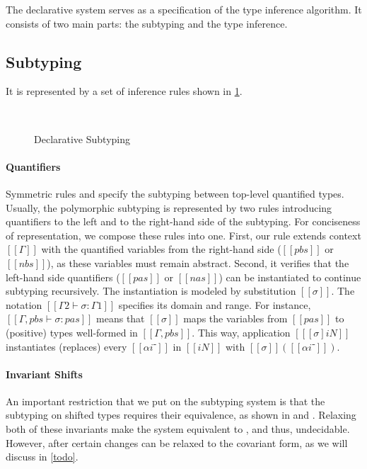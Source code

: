 
The declarative system serves as a specification of the
type inference algorithm. It consists of two main parts:
the subtyping and the type inference. 

\subsection{Subtyping}
It is represented by a set of inference rules shown in
\cref{fig:declarative-subtyping}.

\begin{figure}[h]
  \begin{multicols}{2}
    \ottdefnDOneNsub{}

    \ottdefnDOnePsup{}
  \end{multicols}
  \hfill\\
  \begin{multicols}{2}
    \ottdefnDOneNeq{}

    \ottdefnDOnePeq{}
  \end{multicols}
  \caption{Declarative Subtyping}
  \label{fig:declarative-subtyping}
\end{figure}

\paragraph{Quantifiers}  
Symmetric rules  and 
 specify 
the subtyping between top-level quantified types.
Usually, the polymorphic subtyping is represented by two rules
introducing quantifiers to the left and to the right-hand side of the subtyping.
For conciseness of representation, we compose these rules into one.
First, our rule extends context $[[Γ]]$ with the quantified variables 
from the right-hand side ($[[pbs]]$ or $[[nbs]]$), 
as these variables must remain abstract.
Second, it verifies that the left-hand side quantifiers
($[[pas]]$ or $[[nas]]$) can be instantiated to continue subtyping recursively. 
The instantiation is modeled by substitution $[[σ]]$.
The notation $[[Γ2 ⊢ σ : Γ1]]$ specifies its domain and range.
For instance, $[[Γ, pbs ⊢ σ : {pas}]]$ means that 
$[[σ]]$ maps the variables from $[[pas]]$ to (positive) types
well-formed in $[[Γ, pbs]]$.
This way, application $[[ [σ]iN ]]$ instantiates (replaces) every
$[[αi⁻]]$ in $[[iN]]$ with $[[σ]]([[αi⁻]])$.

\paragraph{Invariant Shifts}
An important restriction that we put on the subtyping system is
that the subtyping on shifted types requires their equivalence,
as shown in  and
. Relaxing both of these
invariants make the system equivalent to \systemf, 
and thus, undecidable. 
However, after certain changes 
 can be relaxed to the covariant form,
 as we will discuss in \cref{todo}.

